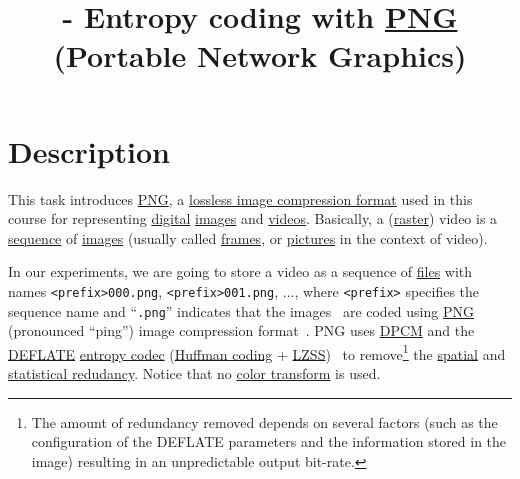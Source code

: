 


\title{\SM{} - Entropy coding with
  \href{https://vicente-gonzalez-ruiz.github.io/PNG/}{PNG} (Portable
  Network Graphics)}

\maketitle

\tableofcontents

\section{Description}

This task introduces
\href{https://vicente-gonzalez-ruiz.github.io/PNG/}{PNG}, a
\href{https://en.wikipedia.org/wiki/Lossless_compression}{lossless
  image compression format} used in this course for representing
\href{https://en.wikipedia.org/wiki/Digital_data}{digital}
\href{https://en.wikipedia.org/wiki/Digital_image}{images} and
\href{https://en.wikipedia.org/wiki/Video}{videos}. Basically, a
(\href{https://en.wikipedia.org/wiki/Raster_graphics}{raster}) video
is a \href{https://en.wikipedia.org/wiki/Sequence}{sequence} of
\href{https://en.wikipedia.org/wiki/Image}{images} (usually called
\href{https://en.wikipedia.org/wiki/Film_frame}{frames}, or
\href{https://en.wikipedia.org/wiki/Group_of_pictures}{pictures} in
the context of video).

In our experiments, we are going to store a video as a sequence of
\href{https://en.wikipedia.org/wiki/Computer_file}{files} with names
{\tt <prefix>000.png}, {\tt <prefix>001.png}, ..., where {\tt <prefix>} specifies the
sequence name and ``{\tt .png}'' indicates that the images~\cite{vruiz__image_video} are coded using
\href{https://en.wikipedia.org/wiki/Portable_Network_Graphics}{PNG}
(pronounced ``ping'') image compression
format~\cite{roelofs1999png,world2003portable}. PNG uses
\href{https://en.wikipedia.org/wiki/Differential_pulse-code_modulation}{DPCM}
and the \href{https://en.wikipedia.org/wiki/DEFLATE}{DEFLATE}
\href{https://en.wikipedia.org/wiki/Entropy_coding}{entropy codec}
(\href{https://en.wikipedia.org/wiki/Huffman_coding}{Huffman coding} +
\href{https://en.wikipedia.org/wiki/Lempel-Ziv-Storer-Szymanski}{LZSS})~\cite{nelson96datacompression}
to remove\footnote{The amount of redundancy removed depends on several factors (such as the configuration of the DEFLATE parameters and the information stored in the image) resulting in an unpredictable output bit-rate.} the
\href{https://en.wikipedia.org/wiki/Image_compression}{spatial} and
\href{https://en.wikipedia.org/wiki/Data_compression}{statistical
  redudancy}. Notice that no
\href{https://en.wikipedia.org/wiki/YUV}{color transform} is
used.

